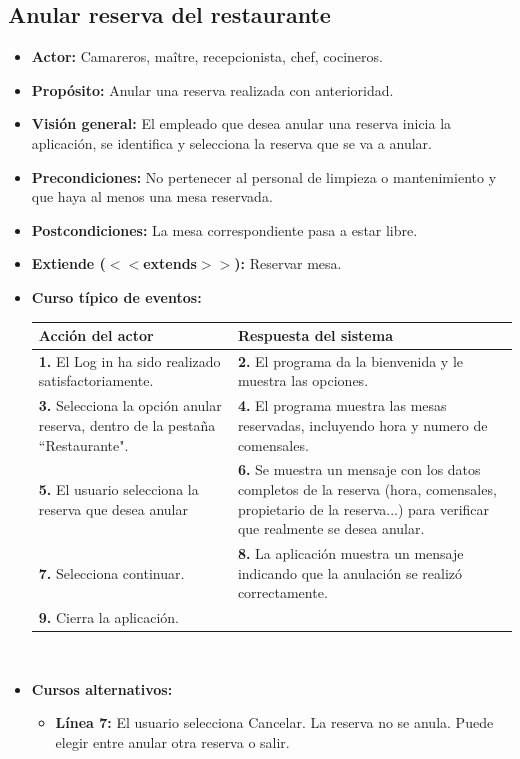 \documentclass[spanish,a4paper,11pt, twoside]{report}	%
\begin{document}
		\subsection{Anular reserva del restaurante}
			\begin{itemize}
			\item \textbf{Actor:} Camareros, maître, recepcionista, chef, cocineros.
			\item \textbf{Propósito:} Anular una reserva realizada con anterioridad.
			\item \textbf{Visión general:} El empleado que desea anular una reserva inicia la aplicación, se identifica y selecciona la reserva que se va a anular.
			\item \textbf{Precondiciones:} No pertenecer al personal de limpieza o mantenimiento y que haya al menos una mesa reservada.
			\item \textbf{Postcondiciones:} La mesa correspondiente pasa a estar libre.
			\item \textbf{Extiende ($<<$extends$>>$):} Reservar mesa.
			\item \textbf{Curso típico de eventos:} 	\\
				\begin{tabular}{|p{6cm}||p{6cm}|}
				\hline
				\textbf{Acción del actor} & \textbf{Respuesta del sistema} \\ \hline \hline
				\textbf{1.}  El Log in ha sido realizado satisfactoriamente. & \textbf{2.} El programa da la bienvenida y le muestra las opciones. \\ \hline
				\textbf{3.} Selecciona la opción anular reserva, dentro de la pestaña “Restaurante". & \textbf{4.} El programa muestra las mesas reservadas, incluyendo hora y numero de comensales. \\ \hline
				\textbf{5.} El usuario selecciona la reserva que desea anular	& \textbf{6.} Se muestra un mensaje con los datos completos de la reserva (hora, comensales, propietario de la reserva...) para verificar que realmente se desea anular. \\ \hline
				\textbf{7.} Selecciona continuar.	& \textbf{8.} La aplicación muestra un mensaje indicando que la anulación se realizó correctamente. \\ \hline
				\textbf{9.} Cierra la aplicación. & \textbf{} \\ \hline
			\end{tabular}
			\\
			\item \textbf{Cursos alternativos:} 
			\begin{itemize}
			\item  \textbf{Línea 7:} El usuario selecciona Cancelar. La reserva no se anula. Puede elegir entre anular otra reserva o salir.
			\end {itemize}
		\end {itemize}
	
\end{document}
